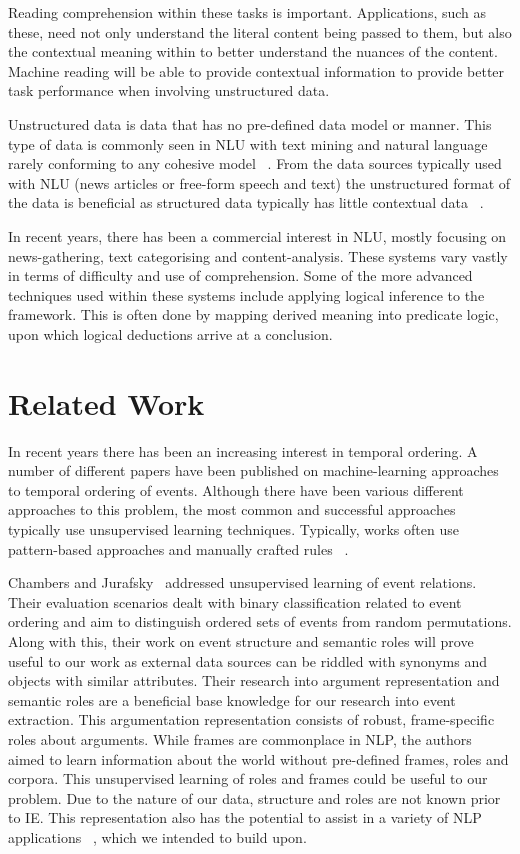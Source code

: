 \documentclass[bsc,frontabs,twoside,singlespacing,parskip,deptreport]{infthesis}     %
\begin{document}
Reading comprehension within these tasks is important. Applications, such as these, need not only understand the literal content
being passed to them, but also the contextual meaning within to better understand the nuances of the content.
Machine reading will be able to provide contextual information to provide better task performance when
involving unstructured data.

Unstructured data is data that has no pre-defined data model or manner. This type of data is
commonly seen in NLU with text mining and natural language rarely conforming to any cohesive model ~\cite{feldman2007text}.
From the data sources typically used with NLU (news articles or free-form speech and text) the unstructured format of
the data is beneficial as structured data typically has little contextual data ~\cite{feldman2007text}.

In recent years, there has been a commercial interest in NLU, mostly focusing on news-gathering, text categorising and
content-analysis. These systems vary vastly in terms of difficulty and use of comprehension. Some of the more
advanced techniques used within these systems include applying logical inference to the framework. This is often done
by mapping derived meaning into predicate logic, upon which logical deductions arrive at a conclusion.


\section{Related Work}
In recent years there has been an increasing interest in temporal ordering.
A number of different papers have been published on machine-learning approaches to temporal ordering of events.
Although there have been various different approaches to this problem, the most common and successful approaches typically
use unsupervised learning techniques. Typically, works often use pattern-based approaches and manually crafted rules ~\cite{chklovski2004mining}.  

Chambers and Jurafsky~\cite{chambers2009unsupervised} addressed unsupervised learning of event relations. Their evaluation
scenarios dealt with binary classification related to event ordering and aim to distinguish ordered sets
of events from random permutations. Along with this, their work on event structure and semantic roles will prove useful
to our work as external data sources can be riddled with synonyms and objects with similar attributes.
Their research into argument representation and semantic roles are a beneficial base
knowledge for our research into event extraction.
This argumentation representation consists of robust,
frame-specific roles about arguments. While frames are commonplace in NLP, the authors aimed to learn information
about the world without pre-defined frames, roles and corpora. This unsupervised learning of roles and frames could
be useful to our problem. Due to the nature of our data, structure and roles are not known prior to
IE. This representation also has the potential to assist in a variety of NLP applications ~\cite{chambers2009unsupervised}, which
we intended to build upon.
\end{document}

